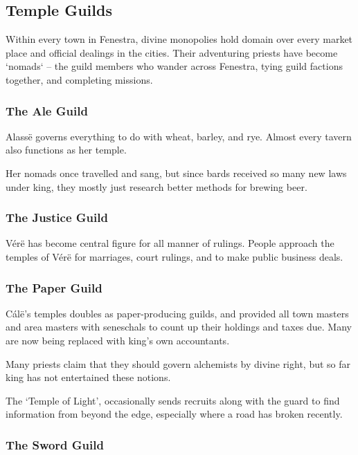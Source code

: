 \begin{multicols}{2}
\subsection{Temple Guilds}
\label{guilds}

Within every town in Fenestra, divine monopolies hold domain over every market place and official dealings in the cities.
Their adventuring priests have become `\glspl{nomad}` -- the guild members who wander across Fenestra, tying guild factions together, and completing missions.

\subsubsection{The Ale Guild}
Alass\"e governs everything to do with wheat, barley, and rye.
Almost every tavern also functions as her temple.

Her \glspl{nomad} once travelled and sang, but since bards received so many new laws under \gls{king}, they mostly just research better methods for brewing beer.

\subsubsection{The Justice Guild}

V\'{e}r\"{e} has become central figure for all manner of rulings.
People approach the temples of V\'{e}r\"{e} for marriages, court rulings, and to make public business deals.

\subsubsection{The Paper Guild}

C\'{a}l\"{e}'s temples doubles as paper-producing guilds, and provided all town masters and area masters with seneschals to count up their holdings and taxes due.
Many are now being replaced with \gls{king}'s own accountants.

Many priests claim that they should govern \gls{alchemists} by divine right, but so far \gls{king} has not entertained these notions.

The `Temple of Light', occasionally sends recruits along with the \gls{guard} to find information from beyond the \gls{edge}, especially where a road has broken recently.

\subsubsection{The Sword Guild}


\end{multicols}
